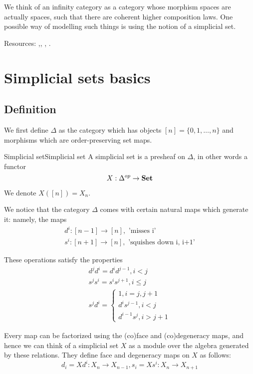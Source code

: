 We think of an infinity category as a category whose morphism spaces are actually spaces, such that there are coherent higher composition laws. One possible way of modelling such things is using the notion of a simplicial set.

Resources: \cite*{riehl_ssets},\cite*{gallauer}, \cite*{land_introduction_2021}, \cite*{lurie_higher_2008}.

\section{Simplicial sets basics}

\subsection{Definition}

We first define $\Delta$ as the category which has objects $[n]=\{0,1,\dots, n\}$ and morphisms which are order-preserving set maps. 

\begin{definition}{Simplicial set}{Simplicial set}
    A simplicial set is a presheaf on $\Delta$, in other words a functor $$X:\Delta^{op}\rightarrow \operatorname{\mathbf{Set}}$$
\end{definition}

We denote $X([n])=X_n$. 

We notice that the category $\Delta$ comes with certain natural maps which generate it: namely, the maps $$\begin{gathered}
    d^i:[n-1]\rightarrow [n], \text{ 'misses i' }\\
    s^i:[n+1]\rightarrow [n], \text{ 'squishes down i, i+1'}
\end{gathered}$$

These operations satisfy the properties $$\begin{gathered}
    d^jd^i = d^id^{j-1}, i<j\\
    s^js^i=s^is^{j+1}, i\leq j\\
    s^jd^i = \begin{cases}
        1, i=j,j+1\\
        d^is^{j-1}, i<j\\
        d^{i-1}s^j, i>j+1
    \end{cases}
\end{gathered}$$

Every map can be factorized using the (co)face and (co)degeneracy maps, and hence we can think of a simplicial set $X$ as a module over the algebra generated by these relations. They define face and degeneracy maps on $X$ as follows: $$d_i = Xd^i:X_n \rightarrow X_{n-1}, s_i = Xs^i:X_n \rightarrow X_{n+1}$$

